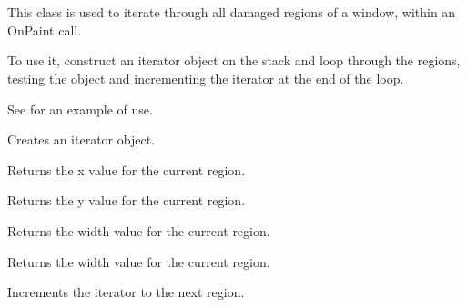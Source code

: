\section{}\label{wxupdateiterator}

This class is used to iterate through all damaged regions of a window, within an OnPaint call.

To use it, construct an iterator object on the stack and loop through the
regions, testing the object and incrementing the iterator at the end of the loop.

See  for an example of use.








Creates an iterator object.



Returns the x value for the current region.



Returns the y value for the current region.



Returns the width value for the current region.



Returns the width value for the current region.



Increments the iterator to the next region.


